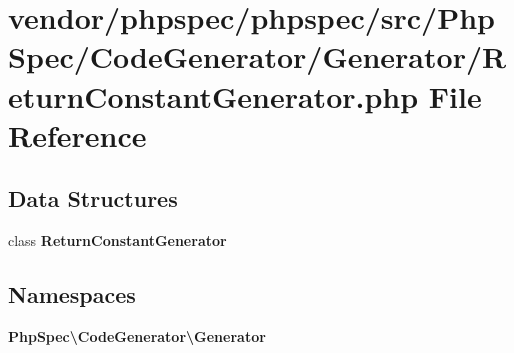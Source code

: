 \section{vendor/phpspec/phpspec/src/\+Php\+Spec/\+Code\+Generator/\+Generator/\+Return\+Constant\+Generator.php File Reference}
\label{_return_constant_generator_8php}
\subsection*{Data Structures}
\begin{DoxyCompactItemize}
\item 
class {\bf Return\+Constant\+Generator}
\end{DoxyCompactItemize}
\subsection*{Namespaces}
\begin{DoxyCompactItemize}
\item 
 {\bf Php\+Spec\textbackslash{}\+Code\+Generator\textbackslash{}\+Generator}
\end{DoxyCompactItemize}
